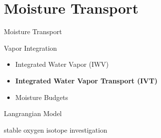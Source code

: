 \section{Moisture Transport}

\begin{frame}{Moisture Transport}

\begin{enumerate}
  \item Vapor Integration
    \begin{itemize}
      \item Integrated Water Vapor (IWV) \cite{gimeno_atmospheric_2014, eiras-barca_seasonal_2016, bao_interpretation_2006, ma_atmospheric_nodate}
      \item \textbf{Integrated Water Vapor Transport (IVT)} \cite{zhu_proposed_1998, sousa_north_2020, jiang_impact_2017, ayantobo_integrated_2022, allan_diagnosing_2016, ralph_dropsonde_2017, ralph_scale_2019}
      \item Moisture Budgets \cite{seager_mechanisms_2020, yang_moisture_2022}
    \end{itemize}
    {\footnotesize
  \item Langrangian Model \cite{ramos_atmospheric_2016, ma_atmospheric_nodate}
    \item stable oxygen isotope investigation \cite{ma_atmospheric_nodate, tian_relation_2001}
    }
\end{enumerate}
  
\end{frame}


